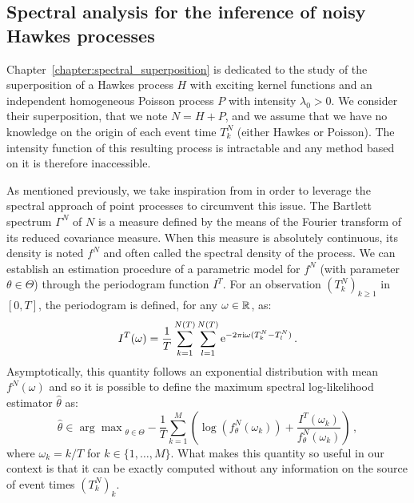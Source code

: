   




    \subsection{Spectral analysis for the inference of noisy Hawkes processes}
    Chapter~\ref{chapter:spectral_superposition} is dedicated to the study of the superposition of a Hawkes process $H$ with exciting kernel functions and an independent homogeneous Poisson process $P$ with intensity $\lambda_0 > 0$.
    We consider their superposition, that we note $N = H + P$,
    and we assume that we have no knowledge on the origin of each event time $T_k^N$ (either Hawkes or Poisson).
    The intensity function of this resulting process is intractable and any method based on it is therefore inaccessible. 
    
    As mentioned previously, we take inspiration from \textcite{Cheysson2022} in order to leverage the spectral approach of point processes to circumvent this issue. 
    The Bartlett spectrum $\Gamma^N$ of $N$ is a measure defined by the means of the Fourier transform of its reduced covariance measure.
    When this measure is absolutely continuous, its density is noted $f^N$ and often called the spectral density of the process.
    We can establish an estimation procedure of a parametric model for $f^N$ (with parameter $\theta\in\Theta$) through the periodogram function $I^T$.
    For an observation $(T_k^N)_{k\geq 1}$ in $[0,T]$, the periodogram is defined, for any $\omega\in{\mathbb R}$, as:
    \begin{equation}\label{eq:chap0_periodogram}
      I^T(\omega) = \frac{1}{T}\sum_{k=1}^{N(T)}\sum_{l=1}^{N(T)}{\mathrm{e}^{-2\pi \mathrm{i} \omega (T_k^N - T_l^N)}}\,.
    \end{equation}
    Asymptotically, this quantity follows an exponential distribution with mean $f^N(\omega)$ and so it is possible to define the maximum spectral log-likelihood estimator $\hat \theta$ as:
    \begin{equation}\label{eq:chap0_spectral_estimator}
      \hat \theta \in {\arg\max}_{\theta\in\Theta} %
        -\frac{1}{T}\sum_{k=1}^{M}{\left(\log\left(f_\theta^N(\omega_k)\right) + \frac{I^T(\omega_k)}{f_\theta^N(\omega_k)}\right)}%
        \,,
    \end{equation}
    where $\omega_k = k/T$ for $k\in\{1,\ldots,M\}$.
    What makes this quantity so useful in our context is that it can be exactly computed without any information on the source of event times $(T_k^N)_k$. 

